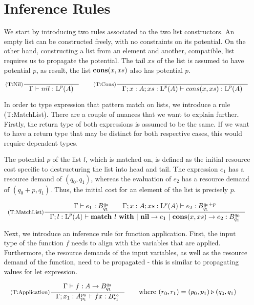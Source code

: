 \section{Inference Rules}

We start by introducing two rules associated to the two list constructors. An empty list can be constructed freely, with no constraints on its potential. On the other hand, constructing a list from an element and another, compatible, list requires us to propagate the potential. The tail \(xs\) of the list is assumed to have potential \(p\), as result, the list \(\textbf{cons}(x, xs)\) also has potential \(p\). 

\[
   \inference[(T:Nil)]
   {}
   {\typing{\Gamma}{nil}{\ralist{p}{A}}}
   \qquad
   \inference[(T:Cons)]
   {}
   {\typing{\Gamma;x : A; xs : \ralist{p}{A}}{cons(x, xs)}{\ralist{p}{A}}}
\]

In order to type expression that pattern match on lists, we introduce a rule (T:MatchList). There are a couple of nuances that we want to explain further. Firstly, the return type of both expressions is assumed to be the same. If we want to have a return type that may be distinct for both respective cases, this would require dependent types. 

The potential \(p\) of the list \(l\), which is matched on, is defined as the initial resource cost specific to destructuring the list into head and tail. The expression \(e_1\) has a resource demand of \((q_0, q_1)\), whereas the evaluation of \(e_2\) has a resource demand of \((q_0 + p, q_1)\). Thus, the initial cost for an element of the list is precisely \(p\).  

\[
   \inference[(T:MatchList)]
   {\typing{\Gamma}{e_1}{\ratype{B}{q_0}{q_1}} \qquad \typing{\Gamma;x : A; xs : \ralist{p}{A}}{e_2}{\ratype{B}{q_0 + p}{q_1}}}
   {\typing{\Gamma;l : \ralist{p}{A}}{\listmatch{l}{e_1}{e_2}}{\ratype{B}{q_0}{q_1}}}
\]

Next, we introduce an inference rule for function application. First, the input type of the function \(f\) needs to align with the variables that are applied. Furthermore, the resource demands of the input variables, as well as the resource demand of the function, need to be propagated - this is similar to propagating values for let expression. 

\[
   \inference[(T:Application)]
   {\typing{\Gamma}{f}{A \to \ratype{B}{q_0}{q_1}}}
   {\typing{\Gamma;x_1:\ratype{A}{p_0}{p_1}}{f x}{\ratype{B}{r_0}{r_1}}}
   \qquad
   \begin{aligned}
      \text{where }  & (r_0, r_1) = (p_0, p_1) \sequence (q_0, q_1)
   \end{aligned}
\]

